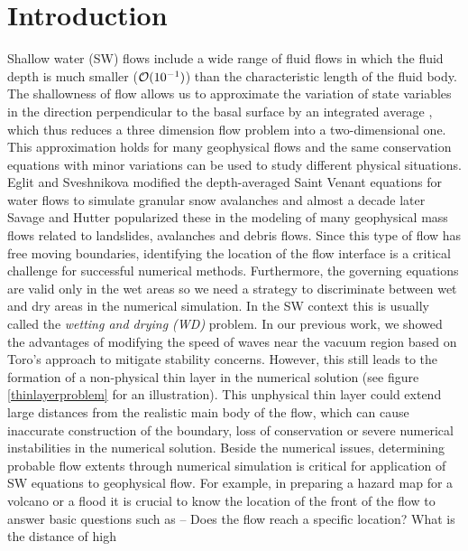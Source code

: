 \documentclass[review]{elsarticle}
\begin{document}
\linenumbers

\section{Introduction} 
\label{introduction}
Shallow water (SW) flows include a wide range of fluid flows in which the fluid depth is much 
smaller (${\cal O}(10^{-1})$) than the characteristic length of the fluid body. The shallowness of flow allows us to approximate the variation of state variables in the direction perpendicular to the basal surface by an integrated average \cite{SavageHutter}, which thus
reduces a three dimension flow problem into a two-dimensional one.
This approximation holds for many geophysical flows and the same 
conservation equations with  minor variations can be used to study different physical situations.
Eglit and Sveshnikova \cite{eglit1980mms} modified the depth-averaged Saint Venant equations for water flows to simulate granular snow avalanches and almost a decade later 
Savage and Hutter \cite{SavageHutter} popularized these in the modeling of many geophysical mass flows related to landslides, avalanches and debris flows. 
Since this type of flow has free moving boundaries, identifying the location of the flow interface is a critical challenge for successful numerical methods. 
Furthermore, the governing equations are valid only in the wet areas so we need a strategy to discriminate between wet and dry areas in the numerical simulation. 
In the SW context this is usually called the {\it wetting and drying (WD)} problem. %
In our previous work\cite{Patra2005}, we showed the advantages of modifying the speed of waves near the vacuum region based on Toro's approach \cite{ToroBook2001}   to mitigate stability concerns. However, this still leads to the formation of a non-physical thin layer in the numerical solution (see figure \ref{thinlayerproblem} for an illustration).
This unphysical thin layer could extend large distances from the realistic main 
body of the flow, which can cause inaccurate construction of the boundary, loss of conservation or severe 
numerical instabilities in the numerical solution. 
Beside the numerical issues, determining probable flow extents through numerical simulation is critical for application of SW equations to 
geophysical flow. For example, in preparing a hazard map 
for a volcano or a flood it is crucial to know the location of the front of the flow to answer basic questions such as --  Does the flow reach a specific location? What is the distance of high 
\end{document}
